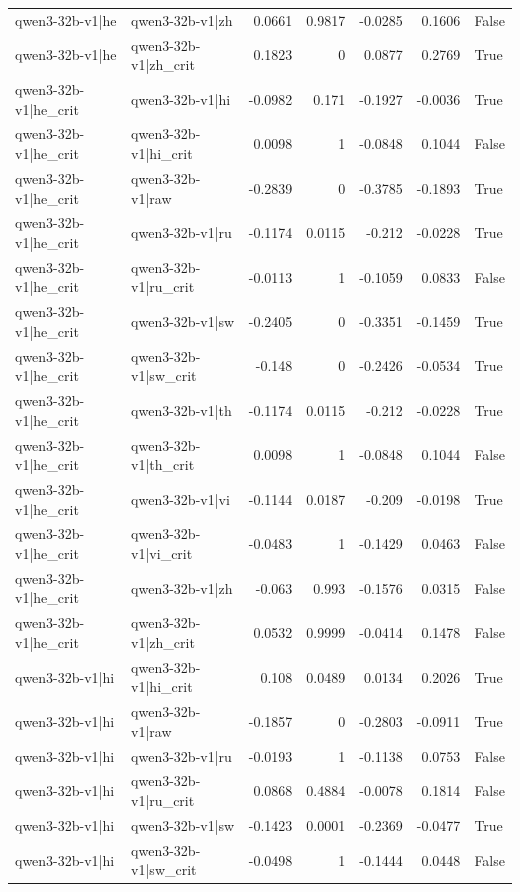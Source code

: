 \begin{table}
\begin{tabular}{l l r r r r l}
qwen3-32b-v1|he & qwen3-32b-v1|zh & 0.0661 & 0.9817 & -0.0285 & 0.1606 & False \\
qwen3-32b-v1|he & qwen3-32b-v1|zh_crit & 0.1823 & 0 & 0.0877 & 0.2769 & True \\
qwen3-32b-v1|he_crit & qwen3-32b-v1|hi & -0.0982 & 0.171 & -0.1927 & -0.0036 & True \\
qwen3-32b-v1|he_crit & qwen3-32b-v1|hi_crit & 0.0098 & 1 & -0.0848 & 0.1044 & False \\
qwen3-32b-v1|he_crit & qwen3-32b-v1|raw & -0.2839 & 0 & -0.3785 & -0.1893 & True \\
qwen3-32b-v1|he_crit & qwen3-32b-v1|ru & -0.1174 & 0.0115 & -0.212 & -0.0228 & True \\
qwen3-32b-v1|he_crit & qwen3-32b-v1|ru_crit & -0.0113 & 1 & -0.1059 & 0.0833 & False \\
qwen3-32b-v1|he_crit & qwen3-32b-v1|sw & -0.2405 & 0 & -0.3351 & -0.1459 & True \\
qwen3-32b-v1|he_crit & qwen3-32b-v1|sw_crit & -0.148 & 0 & -0.2426 & -0.0534 & True \\
qwen3-32b-v1|he_crit & qwen3-32b-v1|th & -0.1174 & 0.0115 & -0.212 & -0.0228 & True \\
qwen3-32b-v1|he_crit & qwen3-32b-v1|th_crit & 0.0098 & 1 & -0.0848 & 0.1044 & False \\
qwen3-32b-v1|he_crit & qwen3-32b-v1|vi & -0.1144 & 0.0187 & -0.209 & -0.0198 & True \\
qwen3-32b-v1|he_crit & qwen3-32b-v1|vi_crit & -0.0483 & 1 & -0.1429 & 0.0463 & False \\
qwen3-32b-v1|he_crit & qwen3-32b-v1|zh & -0.063 & 0.993 & -0.1576 & 0.0315 & False \\
qwen3-32b-v1|he_crit & qwen3-32b-v1|zh_crit & 0.0532 & 0.9999 & -0.0414 & 0.1478 & False \\
qwen3-32b-v1|hi & qwen3-32b-v1|hi_crit & 0.108 & 0.0489 & 0.0134 & 0.2026 & True \\
qwen3-32b-v1|hi & qwen3-32b-v1|raw & -0.1857 & 0 & -0.2803 & -0.0911 & True \\
qwen3-32b-v1|hi & qwen3-32b-v1|ru & -0.0193 & 1 & -0.1138 & 0.0753 & False \\
qwen3-32b-v1|hi & qwen3-32b-v1|ru_crit & 0.0868 & 0.4884 & -0.0078 & 0.1814 & False \\
qwen3-32b-v1|hi & qwen3-32b-v1|sw & -0.1423 & 0.0001 & -0.2369 & -0.0477 & True \\
qwen3-32b-v1|hi & qwen3-32b-v1|sw_crit & -0.0498 & 1 & -0.1444 & 0.0448 & False \\

\end{tabular}
\end{table}
